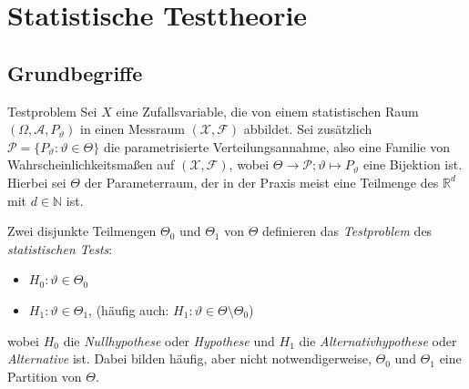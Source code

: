 \section{Statistische Testtheorie}

\subsection{Grundbegriffe}

\begin{defi}{Testproblem}
    Sei $X$ eine Zufallsvariable, die von einem statistischen Raum $(\Omega, \mathcal{A}, P_{\vartheta})$ in einen Messraum $(\mathcal{X}, \mathcal{F})$ abbildet.
    Sei zusätzlich $\mathcal{P} = \{P_{\vartheta} : \vartheta \in \Theta\}$ die parametrisierte Verteilungsannahme, also eine Familie von Wahrscheinlichkeitsmaßen auf $(\mathcal{X}, \mathcal{F})$, wobei $\Theta \to \mathcal{P}; \vartheta \mapsto P_{\vartheta}$ eine Bijektion ist.
    Hierbei sei $\Theta$ der Parameterraum, der in der Praxis meist eine Teilmenge des $\mathbb{R}^d$ mit $d \in \mathbb{N}$ ist.

    Zwei disjunkte Teilmengen $\Theta_0$ und $\Theta_1$ von $\Theta$ definieren das \emph{Testproblem} des \emph{statistischen Tests}:
    \begin{itemize}
        \item $H_0: \vartheta \in \Theta_0$
        \item $H_1: \vartheta \in \Theta_1$, (häufig auch: $H_1: \vartheta \in \Theta \setminus \Theta_0$)
    \end{itemize}
    wobei $H_0$ die \emph{Nullhypothese} oder \emph{Hypothese} und $H_1$ die \emph{Alternativhypothese} oder \emph{Alternative} ist.
    Dabei bilden häufig, aber nicht notwendigerweise, $\Theta_0$ und $\Theta_1$ eine Partition von $\Theta$.
\end{defi}

